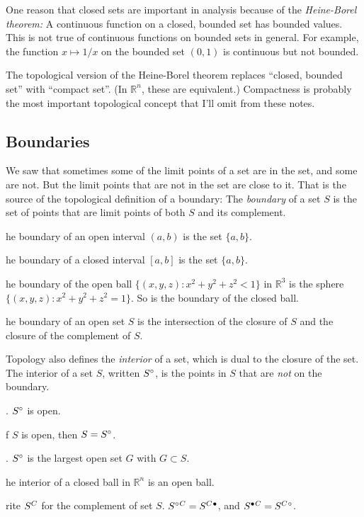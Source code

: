 \documentclass{article}
\def\R{{\mathbb R}}
\def\Rn{{\R^n}}
\newcounter{exercisecounter}\setcounter{exercisecounter}{1}
\def\Exercise.#1\par{{\item\small {\bf Exercise \number\theexercisecounter}.#1\addtocounter{exercisecounter}{1}}}
\def\comp#1{\smash{#1}^C\vphantom{#1}}
\def\inter#1{\smash{#1}^\circ\vphantom{#1}}
\def\clos#1{\smash{#1}^\bullet\vphantom{#1}}
\def\closcomp#1{\clos{\comp{#1}}}
\def\compclos#1{\comp{\clos{#1}}}
\def\intercomp#1{\inter{\comp{#1}}}
\def\compinter#1{\comp{\inter{#1}}}
\begin{document}
One reason that closed sets are important in analysis because of the
{\em Heine-Borel theorem:\/} A continuous function on a closed,
bounded set has bounded values.  This is not true of continuous
functions on bounded sets in general.  For example, the function $x
\mapsto 1/x$ on the bounded set $(0, 1)$ is continuous but not
bounded.

The topological version of the Heine-Borel theorem replaces ``closed,
bounded set'' with ``compact set''.  (In $\Rn$, these are equivalent.)
Compactness is probably the most important topological concept that
I'll omit from these notes.

\subsection*{Boundaries}

We saw that sometimes some of the limit points of a set are in the
set, and some are not.  But the limit points that are not in the set
are close to it.  That is the source of the topological definition of
a boundary: The {\em boundary\/} of a set $S$ is the set of points
that are limit points of both $S$ and its complement.

\begin{itemize}
\Exercise. The boundary of an open interval $(a, b)$ is the set $\{a, b\}$.

\Exercise. The boundary of a closed interval $[a, b]$ is the set $\{a, b\}$.

\Exercise. The boundary of the open ball $\{(x,y,z) : x^2 + y^2 + z^2 <
1\}$ in $\R^3$ is the sphere  $\{(x,y,z) : x^2 + y^2 + z^2 = 1\}$.   So
is the boundary of the closed ball. 

\Exercise. The boundary of an open set $S$ is the intersection of the
closure of $S$ and the closure of the complement of $S$.

\end{itemize}

Topology also defines the {\em interior\/} of a set, which is dual to
the closure of the set.  The interior of a set $S$, written $\inter
S$, is the points in $S$ that are {\em not\/} on the boundary.

\begin{itemize}
\Exercise. $\inter S$ is open.

\Exercise. If $S$ is open, then $S = \inter S$.

\Exercise. $\inter S$ is the largest open set $G$ with $G\subset S$.

\Exercise. The interior of a closed ball in $\Rn$ is an open ball.  

\Exercise. Write $\comp S$ for the complement of set $S$.  $\compinter S = \closcomp S$, and
$\compclos S = \intercomp S$.

\end{itemize}
\end{document}
